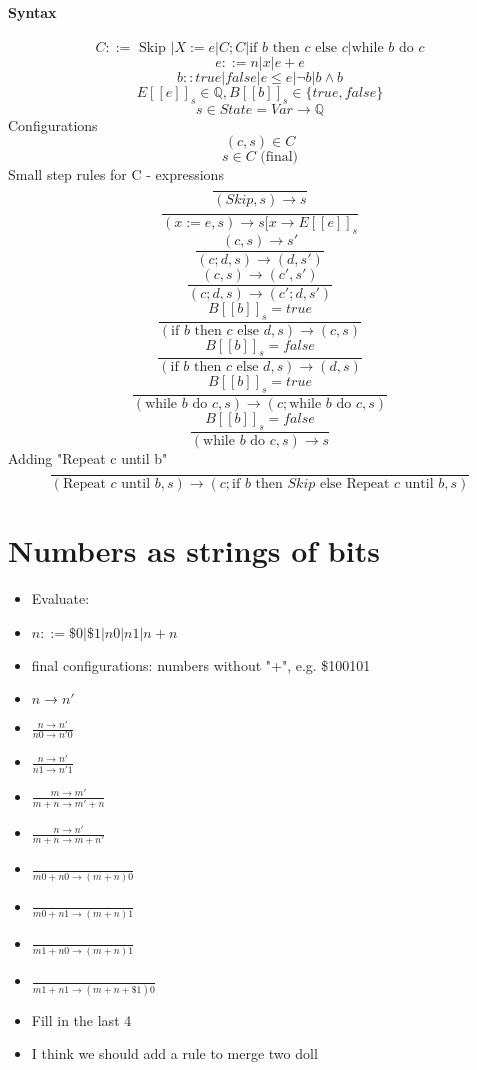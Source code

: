 \documentclass{article}
\begin{document}
\paragraph{Syntax}
$$C::=\text{ Skip }| X:=e|C;C|\text{if }b\text{ then }c\text{ else }c |\text{while }b\text{ do }c$$
$$e::= n|x|e+e$$
$$b::true|false|e\leq e|\neg b | b\wedge b$$
$$ E[[e]]_{s}\in\mathbb{Q} , B[[b]]_{s}\in\{true, false\}$$
$$ s\in State = Var\rightarrow \mathbb{Q} $$
Configurations
$$ (c, s)\in C $$
$$ s\in C\text{ (final)}$$
Small step rules for C - expressions
$$\frac{}{(Skip, s)\rightarrow s}$$
$$\frac{}{(x:=e, s)\rightarrow s[x\rightarrow E[[e]]_{s}}$$
$$\frac{(c, s)\rightarrow s'}{(c;d, s)\rightarrow (d, s')}$$
$$\frac{(c, s)\rightarrow (c', s')}{(c;d, s)\rightarrow (c';d, s')}$$
$$\frac{B[[b]]_{s}=true}{(\text{if }b\text{ then }c\text{ else }d , s)\rightarrow (c, s)}$$
$$\frac{B[[b]]_{s}=false}{(\text{if }b\text{ then }c\text{ else }d , s)\rightarrow (d, s)}$$
$$\frac{B[[b]]_{s}=true}{(\text{while }b\text{ do }c, s)\rightarrow (c; \text{while }b\text{ do }c, s)}$$
$$\frac{B[[b]]_{s}=false}{(\text{while }b\text{ do }c , s)\rightarrow s}$$
Adding "Repeat c until b"
$$\frac{}{(\text{Repeat }c\text{ until }b, s)\rightarrow (c ; \text{if }b\text{ then }Skip\text{ else }\text{Repeat }c\text{ until }b, s)}$$

\section{Numbers as strings of bits}
\begin{itemize}
	\item Evaluate:
	\item $n::=\$0|\$1|n 0|n 1|n + n$
	\item final configurations: numbers without "+", e.g. \$100101
	\item $ n\rightarrow n' $
	\item $\frac{n\rightarrow n'}{n0\rightarrow n'0}$
	\item $\frac{n\rightarrow n'}{n1\rightarrow n'1}$
	\item $\frac{m\rightarrow m'}{m+n\rightarrow m'+n}$
	\item $\frac{n\rightarrow n'}{m+n\rightarrow m+n'}$
	\item $\frac{}{m0+n0\rightarrow (m+n)0}$
	\item $\frac{}{m0+n1\rightarrow (m+n)1}$
	\item $\frac{}{m1+n0\rightarrow (m+n)1}$
	\item $\frac{}{m1+n1\rightarrow (m+n+\$1)0}$
	\item Fill in the last 4
	\item I think we should add a rule to merge two doll
\end{itemize}
\end{document}
